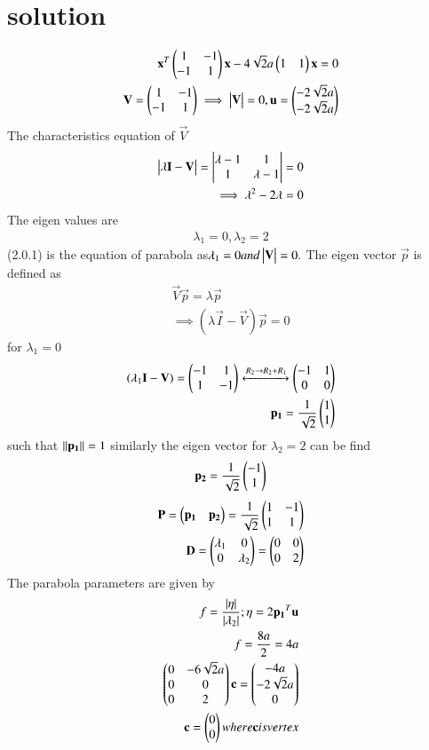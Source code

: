 \documentclass[journal,12pt,twocolumn]{IEEEtran}
\begin{document}
\section{solution}
\begin{align}
\mathbf{x}^T\begin{pmatrix}1&-1\\-1&1\end{pmatrix}\mathbf{x}-4\sqrt{2}a\begin{pmatrix}1&1\end{pmatrix}\mathbf{x}=0\\
\mathbf{V}=\begin{pmatrix}1&-1\\-1&1\end{pmatrix}\implies\begin{vmatrix}\mathbf{V}\end{vmatrix}=0,\mathbf{u}=\begin{pmatrix}-2\sqrt{2}a\\-2\sqrt{2}a\end{pmatrix}
\end{align}
The characteristics equation of $\vec{V}$
\begin{align}
\begin{vmatrix}\lambda\mathbf{I}-\mathbf{V}\end{vmatrix}=\begin{vmatrix}\lambda-1&1\\1&\lambda-1\end{vmatrix}=0\\
\implies\lambda^{2}-2\lambda=0
\end{align}
The eigen values are
\begin{align}
  \lambda{_1}=0,\lambda{_2} =2
\end{align}
(2.0.1) is the equation of parabola as$\lambda{_1}=0 and \begin{vmatrix}\mathbf{V}\end{vmatrix}=0.$ 
The eigen vector $\vec{p}$ is defined as
\begin{align}
    \vec{V}\vec{p}=\lambda{\vec{p}}\\
    \implies(\lambda{\vec{I}}-\vec{V})\vec{p}=0
\end{align}
for $\lambda{_1}=0$
\begin{align}
(\lambda{_1}\mathbf{I}-\mathbf{V})= \begin{pmatrix}-1&1\\1&-1\end{pmatrix}\xleftrightarrow[]{R_2\rightarrow{R_2+R_1}}\begin{pmatrix}-1&1\\0&0\end{pmatrix}\\\mathbf{p_1}=\frac{1}{\sqrt{2}}\begin{pmatrix}1\\1\end{pmatrix}
\end{align}
such that $\lVert\mathbf{p_1}\rVert=1$ similarly the eigen vector for $\lambda{_2}=2$ can be find
\begin{align}
    \mathbf{p_2}=\frac{1}{\sqrt{2}}\begin{pmatrix}-1\\1\end{pmatrix}
\end{align}
\begin{align}
\mathbf{P}=\begin{pmatrix}\mathbf{p_1}&\mathbf{p_2}\end{pmatrix}=\frac{1}{\sqrt{2}}\begin{pmatrix}1&-1\\1&1\end{pmatrix}\\
\mathbf{D}=\begin{pmatrix}\lambda_1&0\\0&\lambda_2\end{pmatrix}=\begin{pmatrix}0&0\\0&2\end{pmatrix}
\end{align}
The parabola parameters are given by
\begin{align}
    f=\frac{|\eta|}{|\lambda{_2}|} ; \eta=2\mathbf{p_1}^T\mathbf{u}\\
    f= \frac{8a}{2}=4a\\
    \begin{pmatrix}0 &-6\sqrt{2}a \\ 0 & 0 \\ 0 & 2\end{pmatrix}\mathbf{c}=\begin{pmatrix}-4a\\-2\sqrt{2}a\\0\\\end{pmatrix}\\
    \mathbf{c}=\begin{pmatrix}0\\0\end{pmatrix} where \mathbf{c} is vertex
\end{align}
\end{document}
